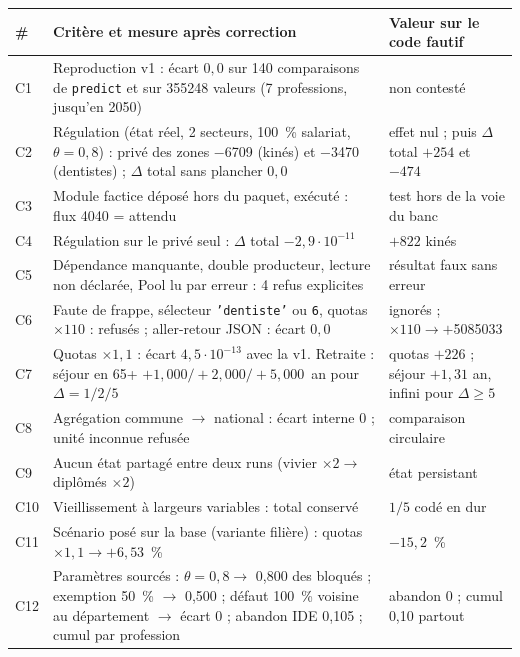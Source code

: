 \documentclass[11pt]{article}
\begin{document}
\begin{table}[h]
\centering\small
\begin{tabular}{lp{6.3cm}p{5.0cm}}
\toprule
\# & Critère et mesure après correction & Valeur sur le code fautif \\
\midrule
C1 & Reproduction v1 : écart $0{,}0$\mesure{} sur 140 comparaisons de \texttt{predict} et sur
\num{355248} valeurs (7 professions, jusqu'en 2050) & non contesté \\
C2 & Régulation (état réel, 2 secteurs, 100~\% salariat, $\theta = 0{,}8$) : privé des zones
$-$\num{6709}\mesure{} (kinés) et $-$\num{3470}\mesure{} (dentistes) ; $\Delta$ total sans plancher
$0{,}0$\mesure{} & effet nul ; puis $\Delta$ total $+254$ et $-474$ \\
C3 & Module factice déposé hors du paquet, exécuté : flux \num{4040} = attendu & test hors de la
voie du banc \\
C4 & Régulation sur le privé seul : $\Delta$ total $-2{,}9\cdot10^{-11}$\mesure{} & $+822$ kinés \\
C5 & Dépendance manquante, double producteur, lecture non déclarée, Pool lu par erreur : 4 refus
explicites & résultat faux sans erreur \\
C6 & Faute de frappe, sélecteur \texttt{'dentiste'} ou \texttt{6}, quotas $\times110$ : refusés ;
aller-retour JSON : écart $0{,}0$ & ignorés ; $\times110 \to +$\num{5085033} \\
C7 & Quotas $\times1{,}1$ : écart $4{,}5\cdot10^{-13}$\mesure{} avec la v1. Retraite : séjour en
65+ $+1{,}000 / +2{,}000 / +5{,}000$\mesure{}~an pour $\Delta = 1/2/5$ & quotas $+226$ ; séjour
$+1{,}31$ an, infini pour $\Delta \ge 5$ \\
C8 & Agrégation commune $\to$ national : écart interne 0\mesure{} ; unité inconnue refusée &
comparaison circulaire \\
C9 & Aucun état partagé entre deux runs (vivier $\times2 \to$ diplômés $\times2$) & état
persistant \\
C10 & Vieillissement à largeurs variables : total conservé & $1/5$ codé en dur \\
C11 & Scénario posé sur la base (variante filière) : quotas $\times1{,}1 \to +6{,}53$\mesure{}~\% &
$-15{,}2$~\% \\
C12 & Paramètres sourcés : $\theta = 0{,}8 \to$ 0,800\mesure{} des bloqués ; exemption 50~\%
$\to$ 0,500\mesure{} ; défaut 100~\% voisine au département $\to$ écart 0 ; abandon IDE
0,105\derive{} ; cumul par profession & abandon 0 ; cumul 0,10 partout \\

\end{tabular}
\end{table}
\end{document}
